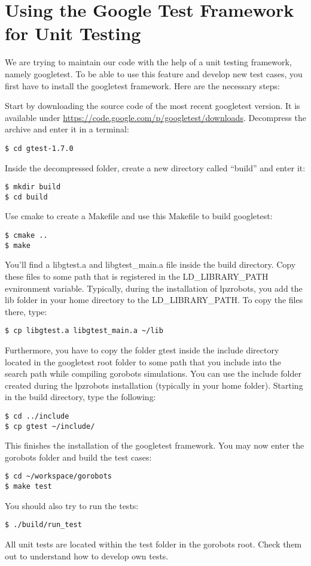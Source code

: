 \section{Using the Google Test Framework for Unit Testing}

We are trying to maintain our code with the help of a unit testing framework, namely googletest. To be able to use this feature and develop new test cases, you first have to install the googletest framework. Here are the necessary steps:

Start by downloading the source code of the most recent googletest version. It is available under \url{https://code.google.com/p/googletest/downloads}. Decompress the archive and enter it in a terminal:
\begin{lstlisting}
$ cd gtest-1.7.0
\end{lstlisting}
Inside the decompressed folder, create a new directory called ``build'' and enter it:
\begin{lstlisting}
$ mkdir build
$ cd build
\end{lstlisting}
Use cmake to create a Makefile and use this Makefile to build googletest:
\begin{lstlisting}
$ cmake ..
$ make
\end{lstlisting}
You'll find a libgtest.a and libgtest\_main.a file inside the build directory. Copy these files to some path that is registered in the LD\_LIBRARY\_PATH evnironment variable. Typically, during the installation of lpzrobots, you add the lib folder in your home directory to the LD\_LIBRARY\_PATH. To copy the files there, type:
\begin{lstlisting}
$ cp libgtest.a libgtest_main.a ~/lib
\end{lstlisting}
Furthermore, you have to copy the folder gtest inside the include directory located in the googletest root folder to some path that you include into the search path while compiling gorobots simulations. You can use the include folder created during the lpzrobots installation (typically in your home folder). Starting in the build directory, type the following:
\begin{lstlisting}
$ cd ../include
$ cp gtest ~/include/
\end{lstlisting}
This finishes the installation of the googletest framework. You may now enter the gorobots folder and build the test cases:
\begin{lstlisting}
$ cd ~/workspace/gorobots
$ make test
\end{lstlisting}
You should also try to run the tests:
\begin{lstlisting}
$ ./build/run_test
\end{lstlisting}

All unit tests are located within the test folder in the gorobots root. Check them out to understand how to develop own tests.



